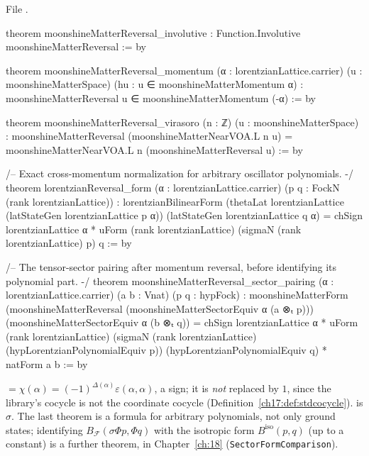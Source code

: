 \noindent File .
\begin{leancode}
theorem moonshineMatterReversal_involutive : Function.Involutive moonshineMatterReversal := by

theorem moonshineMatterReversal_momentum (α : lorentzianLattice.carrier)
    (u : moonshineMatterSpace) (hu : u ∈ moonshineMatterMomentum α) :
    moonshineMatterReversal u ∈ moonshineMatterMomentum (-α) := by

theorem moonshineMatterReversal_virasoro (n : ℤ) (u : moonshineMatterSpace) :
    moonshineMatterReversal (moonshineMatterNearVOA.L n u) =
      moonshineMatterNearVOA.L n (moonshineMatterReversal u) := by

/-- Exact cross-momentum normalization for arbitrary oscillator polynomials. -/
theorem lorentzianReversal_form (α : lorentzianLattice.carrier)
    (p q : FockN (rank lorentzianLattice)) :
    lorentzianBilinearForm (thetaLat lorentzianLattice (latStateGen lorentzianLattice p α))
      (latStateGen lorentzianLattice q α) =
      chSign lorentzianLattice α * uForm (rank lorentzianLattice)
        (sigmaN (rank lorentzianLattice) p) q := by

/-- The tensor-sector pairing after momentum reversal, before identifying its polynomial part. -/
theorem moonshineMatterReversal_sector_pairing (α : lorentzianLattice.carrier)
    (a b : Vnat) (p q : hypFock) :
    moonshineMatterForm
      (moonshineMatterReversal (moonshineMatterSectorEquiv α (a ⊗ₜ p)))
      (moonshineMatterSectorEquiv α (b ⊗ₜ q)) =
      chSign lorentzianLattice α *
        uForm (rank lorentzianLattice)
          (sigmaN (rank lorentzianLattice) (hypLorentzianPolynomialEquiv p))
          (hypLorentzianPolynomialEquiv q) * natForm a b := by
\end{leancode}

\begin{dictionary}
 $=\chi(\alpha)=(-1)^{\Delta(\alpha)}\varepsilon(\alpha,\alpha)$, a sign; it is \emph{not} replaced by $1$, since the
library's cocycle is not the coordinate cocycle (Definition~\ref{ch17:def:stdcocycle}).   is $\sigma$.  The last
theorem is a formula for arbitrary polynomials, not only ground states; identifying
$B_{\mathcal F}(\sigma\Phi p,\Phi q)$ with the isotropic form $B^{\mathrm{iso}}(p,q)$ (up to a constant) is a further theorem, in
Chapter~\ref{ch:18} (\texttt{SectorFormComparison}).
\end{dictionary}

